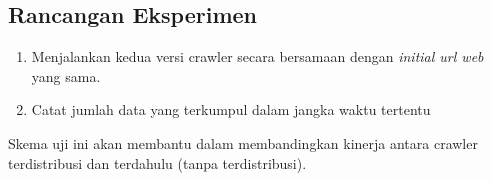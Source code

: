 \subsection{Rancangan Eksperimen}

\begin{enumerate}
  \item{Menjalankan kedua versi crawler secara bersamaan dengan \emph{initial url web} yang sama.}
  \item{Catat jumlah data yang terkumpul dalam jangka waktu tertentu}
\end{enumerate}




Skema uji ini akan membantu dalam membandingkan kinerja antara crawler terdistribusi dan terdahulu (tanpa terdistribusi).
